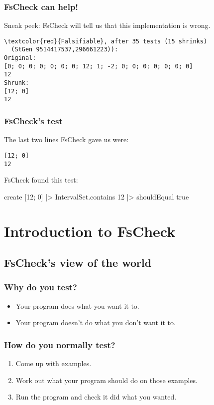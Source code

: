 \documentclass{beamer}
\begin{document}
\begin{frame}[fragile]
\frametitle{FsCheck can help!}

Sneak peek: FsCheck will tell us that this implementation is wrong.

\begin{Verbatim}[commandchars=\\\{\}]
\textcolor{red}{Falsifiable}, after 35 tests (15 shrinks)
  (StGen 9514417537,296661223)):
Original:
[0; 0; 0; 0; 0; 0; 0; 12; 1; -2; 0; 0; 0; 0; 0; 0; 0]
12
Shrunk:
[12; 0]
12
\end{Verbatim}

\end{frame}

\begin{frame}[fragile]
\frametitle{FsCheck's test}
The last two lines FsCheck gave us were:
\begin{verbatim}
[12; 0]
12
\end{verbatim}

FsCheck found this test:

\begin{fslisting}
create [12; 0]
|> IntervalSet.contains 12
|> shouldEqual true
\end{fslisting}
\end{frame}

\section{Introduction to FsCheck}
\subsection{FsCheck's view of the world}

\begin{frame}
\tableofcontents
\end{frame}

\begin{frame}
\frametitle{Why do you test?}

\begin{itemize}
    \item Your program does what you want it to.
    \item Your program doesn't do what you don't want it to.
\end{itemize}
\end{frame}

\begin{frame}
\frametitle{How do you normally test?}

\begin{enumerate}
    \item Come up with examples.
    \item Work out what your program should do on those examples.
    \item Run the program and check it did what you wanted.
\end{enumerate}
\end{frame}
\end{document}
